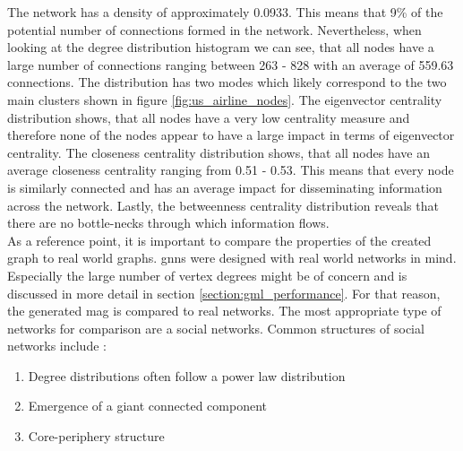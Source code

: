   \noindent The network has a density of approximately 0.0933. This means that 
  9\% of the potential number of connections formed in the network.
  Nevertheless, when looking at the degree distribution histogram we can see, 
  that all nodes have a large number of connections ranging between 263 -
  828 with an average of 559.63 connections. The distribution has two
  modes which likely correspond to the two main clusters shown in figure
  \ref{fig:us_airline_nodes}. The eigenvector centrality distribution shows, 
  that all nodes have a very low centrality measure and therefore none of the 
  nodes appear to have a large impact in terms of eigenvector centrality. The 
  closeness centrality distribution shows, that all nodes have an average 
  closeness centrality ranging from 0.51 - 0.53. This means that every node is 
  similarly connected and has an average impact for disseminating information 
  across the network. Lastly, the betweenness centrality distribution reveals 
  that there are no bottle-necks through which information flows. \\

  \noindent As a reference point, it is important to compare the properties of
  the created graph to real world graphs. \acsp{gnn} were designed with real
  world networks in mind. Especially the large number of vertex degrees might
  be of concern and is discussed in more detail in section 
  \ref{section:gml_performance}. For that reason, the generated \acs{mag} is
  compared to real networks. The most appropriate type of networks for comparison 
  are a social networks. Common structures of social networks include 
  \citep{watts1998collective,newman2006structure,Newman2010,kim2012multiplicative}:

  \begin{enumerate}
    \item Degree distributions often follow a power law distribution
    \item Emergence of a giant connected component
    \item Core-periphery structure
  \end{enumerate}

